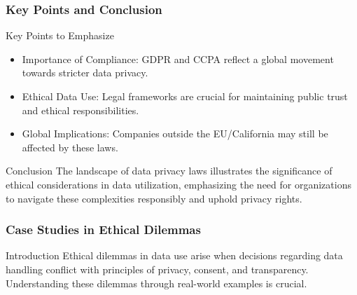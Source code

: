\documentclass[aspectratio=169]{beamer}
\begin{document}
\begin{frame}[fragile]
  \frametitle{Key Points and Conclusion}
  \begin{block}{Key Points to Emphasize}
    \begin{itemize}
      \item Importance of Compliance: GDPR and CCPA reflect a global movement towards stricter data privacy.
      \item Ethical Data Use: Legal frameworks are crucial for maintaining public trust and ethical responsibilities.
      \item Global Implications: Companies outside the EU/California may still be affected by these laws.
    \end{itemize}
  \end{block}
  
  \begin{block}{Conclusion}
    The landscape of data privacy laws illustrates the significance of ethical considerations in data utilization, emphasizing the need for organizations to navigate these complexities responsibly and uphold privacy rights.
  \end{block}
\end{frame}

\begin{frame}[fragile]
    \frametitle{Case Studies in Ethical Dilemmas}
    \begin{block}{Introduction}
        Ethical dilemmas in data use arise when decisions regarding data handling conflict with principles of privacy, consent, and transparency. Understanding these dilemmas through real-world examples is crucial.
    \end{block}
\end{frame}
\end{document}
